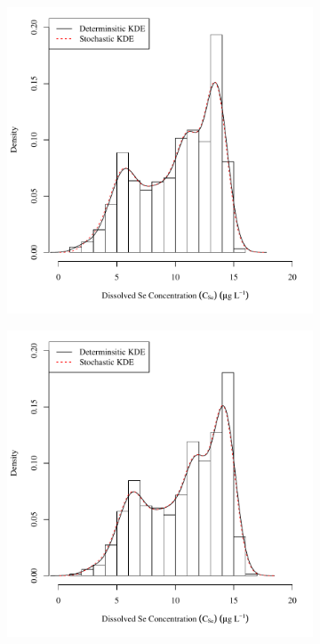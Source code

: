 \begin{linenumbers}
\subfiguremid
\begin{landscape}
	\begin{figure}
		\begin{subfigure}{0.7\textwidth}
			\centering
			\includegraphics[width=\tableCustomSize]{"Figures/Results_USR/Stochastic/c d&s est FLS"}
		\end{subfigure}%
		\begin{subfigure}{0.7\textwidth}
			\centering
			\includegraphics[width=\tableCustomSize]{"Figures/Results_USR/Stochastic/c d&s est FLY"}

\end{subfigure}
\end{figure}
\end{landscape}
\end{linenumbers}
